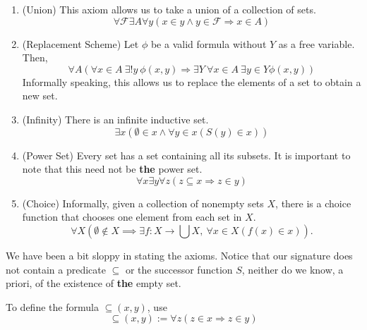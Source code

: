 \begin{enumerate}[label=\bfseries ZF\arabic*]
    \item (Union) This axiom allows us to take a union of a collection of sets.
    \begin{equation*}
        \forall\mathscr F\exists A\forall y(x\in y\wedge y\in\mathscr F\Longrightarrow x\in A)
    \end{equation*}

    \item (Replacement Scheme) Let $\phi$ be a valid formula without $Y$ as a free variable. Then, 
    \begin{equation*}
        \forall A(\forall x\in A~\exists!y~\phi(x,y)\Longrightarrow\exists Y~\forall x\in A~\exists y\in Y\phi(x,y))
    \end{equation*}
    Informally speaking, this allows us to replace the elements of a set to obtain a new set.

    \item (Infinity) There is an infinite inductive set.
    \begin{equation*}
        \exists x(\emptyset\in x\wedge\forall y\in x(S(y)\in x))
    \end{equation*}

    \item (Power Set) Every set has a set containing all its subsets. It is important to note that this need not be \textbf{the} power set.
    \begin{equation*}
        \forall x\exists y\forall z(z\subseteq x\Longrightarrow z\in y)
    \end{equation*}

    \item (Choice) Informally, given a collection of nonempty sets $X$, there is a choice function that chooses one element from each set in $X$.
    \begin{equation*}
        \forall X\left(\emptyset\notin X\implies\exists f: X\to\bigcup X,~\forall x\in X(f(x)\in x)\right).
    \end{equation*}
\end{enumerate}

We have been a bit sloppy in stating the axioms. Notice that our signature does not contain a predicate $\subseteq$ or the successor function $S$, neither do we know, a priori, of the existence of \textbf{the} empty set.

To define the formula $\subseteq(x,y)$, use 
\begin{equation*}
    \subseteq(x,y) := \forall z(z\in x\Longrightarrow z\in y)
\end{equation*}

